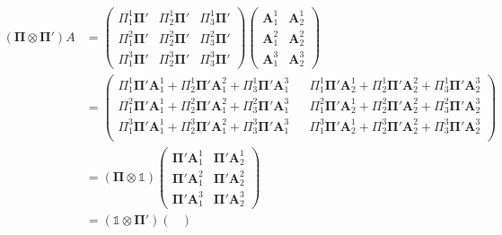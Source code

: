 \begin{equation}
  \begin{split}
    ( \mathbf{\Pi} \otimes \mathbf{\Pi}' ) A & =
    \begin{pmatrix}
      \Pi^1_1\mathbf{\Pi}' & \Pi^1_2\mathbf{\Pi}' & \Pi^1_3\mathbf{\Pi}'\\
      \Pi^2_1\mathbf{\Pi}' & \Pi^2_2\mathbf{\Pi}' & \Pi^2_3\mathbf{\Pi}'\\
      \Pi^3_1\mathbf{\Pi}' & \Pi^3_2\mathbf{\Pi}' & \Pi^3_3\mathbf{\Pi}'
    \end{pmatrix}
    \begin{pmatrix}
      \mathbf{A}^1_1 & \mathbf{A}^1_2 \\
      \mathbf{A}^2_1 & \mathbf{A}^2_2 \\
      \mathbf{A}^3_1 & \mathbf{A}^3_2
    \end{pmatrix}\\
    & =
    \begin{pmatrix}
      \Pi^1_1 \mathbf{\Pi}' \mathbf{A}^1_1
      + \Pi^1_2 \mathbf{\Pi}' \mathbf{A}^2_1
      + \Pi^1_3 \mathbf{\Pi}' \mathbf{A}^3_1 &&
      \Pi^1_1 \mathbf{\Pi}' \mathbf{A}^1_2
      + \Pi^1_2 \mathbf{\Pi}' \mathbf{A}^2_2
      + \Pi^1_3 \mathbf{\Pi}' \mathbf{A}^3_2 \\
      \Pi^2_1 \mathbf{\Pi}' \mathbf{A}^1_1
      + \Pi^2_2 \mathbf{\Pi}' \mathbf{A}^2_1
      + \Pi^2_3 \mathbf{\Pi}' \mathbf{A}^3_1 &&
      \Pi^2_1 \mathbf{\Pi}' \mathbf{A}^1_2
      + \Pi^2_2 \mathbf{\Pi}' \mathbf{A}^2_2
      + \Pi^2_3 \mathbf{\Pi}' \mathbf{A}^3_2 \\
      \Pi^3_1 \mathbf{\Pi}' \mathbf{A}^1_1
      + \Pi^3_2 \mathbf{\Pi}' \mathbf{A}^2_1
      + \Pi^3_3 \mathbf{\Pi}' \mathbf{A}^3_1 &&
      \Pi^3_1 \mathbf{\Pi}' \mathbf{A}^1_2
      + \Pi^3_2 \mathbf{\Pi}' \mathbf{A}^2_2
      + \Pi^3_3 \mathbf{\Pi}' \mathbf{A}^3_2 \\
    \end{pmatrix}\\
    & =
    ( \mathbf{\Pi} \otimes \mathbb{1} )
    \begin{pmatrix}
      \mathbf{\Pi}' \mathbf{A}^1_1 & \mathbf{\Pi}' \mathbf{A}^1_2 \\
      \mathbf{\Pi}' \mathbf{A}^2_1 & \mathbf{\Pi}' \mathbf{A}^2_2 \\
      \mathbf{\Pi}' \mathbf{A}^3_1 & \mathbf{\Pi}' \mathbf{A}^3_2
    \end{pmatrix}\\
    & =
    ( \mathbb{1} \otimes \mathbf{\Pi}' )
    \begin{pmatrix}

\end{pmatrix}
\end{split}
\end{equation}
